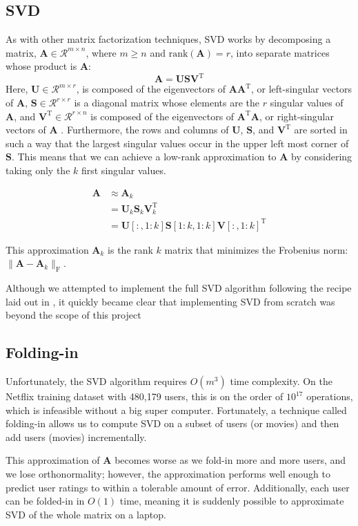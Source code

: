 \documentclass{article} %
\newcommand{\A}{\mathbf{A}}
\newcommand{\T}{\textrm{T}}
\begin{document}
\subsection{SVD}

As with other matrix factorization techniques, SVD works by decomposing a matrix, $\A \in \mathcal{R}^{m \times n}$, where $m \geq n$ and 
$\textrm{rank}(\A) = r$, 
into separate matrices whose product is $\A$:
$$\A = \mathbf{U}\mathbf{S}\mathbf{V}^{\T}$$
Here, $\mathbf{U} \in \mathcal{R}^{m \times r}$, is composed of the eigenvectors of $\A\A^{\T}$, or left-singular vectors of $\A$, 
$\mathbf{S} \in \mathcal{R}^{r \times r}$ is a diagonal matrix whose elements are the $r$ singular values of $\A$,
and $\mathbf{V}^{\T} \in \mathcal{R}^{r \times n}$ is composed of the
eigenvectors of $\A^{\T}\A$, or right-singular vectors of $\A$
\cite{golub1970}.
Furthermore, the rows and columns of $\mathbf{U}$, $\mathbf{S}$, and $\mathbf{V}^{\T}$ are sorted in such a way that the largest singular values occur in the upper left most corner of $\mathbf{S}$.
This means that we can achieve a low-rank approximation to $\A$ by considering taking only the $k$ first singular values.

\begin{align*}
	\A &\approx \A_k\\
	&= \mathbf{U}_k\mathbf{S}_k\mathbf{V}_k^{\T}\\
	&= \mathbf{U}[:,1:k]\mathbf{S}[1:k,1:k]\mathbf{V}[:,1:k]^{\T}
\end{align*}

This approximation $\A_k$ is the rank $k$ matrix that minimizes the Frobenius norm: $\|\A - \A_k\|_{\textrm{F}}$.

Although we attempted to implement the full SVD algorithm following the recipe laid out in \cite{recipes2007}, it quickly became clear that implementing SVD from scratch was beyond the scope of this project

\subsection{Folding-in}
Unfortunately, the SVD algorithm requires $O(m^3)$ time complexity.
On the Netflix training dataset with 480,179 users, this is on the order
of $10^{17}$ operations, which is infeasible without a big super computer.
Fortunately, a technique called folding-in allows us to compute SVD on a subset of users (or movies) and then add users (movies) incrementally.


This approximation of $\A$ becomes worse as we fold-in more and more users, and we lose orthonormality; 
however, the approximation performs well enough to predict user ratings to within a tolerable amount of error.
Additionally, each user can be folded-in in $O(1)$ time, meaning it is suddenly possible to approximate SVD of the whole matrix on a laptop.
\end{document}
